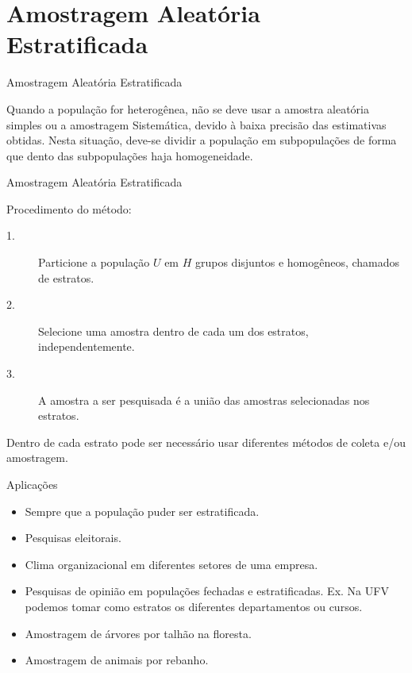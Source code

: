 \documentclass[14pt,aspectratio=1610]{beamer}
\begin{document}
\section{Amostragem Aleatória Estratificada}
\begin{frame}{Amostragem Aleatória Estratificada}
    \begin{block}{}
    \justifying
Quando a população for heterogênea, não se deve usar a amostra aleatória
simples ou a amostragem Sistemática, devido à baixa precisão das estimativas obtidas. Nesta situação, deve-se dividir a população em subpopulações de forma que dento das subpopulações haja homogeneidade.
    \end{block}
\end{frame}

\begin{frame}{Amostragem Aleatória Estratificada}
    \begin{block}{}
    \justifying
Procedimento do método:
\begin{description}
    \item[1.~]Particione a população $U$ em $H$ grupos disjuntos e homogêneos, chamados de estratos.\pause
    \item[2.~]Selecione uma amostra dentro de cada um dos estratos, independentemente.\pause
    \item[3.~]A amostra a ser pesquisada é a união das amostras selecionadas nos estratos.\pause
\end{description}
Dentro de cada estrato pode ser necessário usar diferentes métodos de
coleta e/ou amostragem.
    \end{block}
\end{frame}

\begin{frame}{Aplicações}
    \begin{block}{}
    \justifying
\begin{itemize}[label={}]
    \item Sempre que a população puder ser estratificada.\pause
    \item Pesquisas eleitorais.\pause
    \item Clima organizacional em diferentes setores de uma empresa.\pause
    \item Pesquisas de opinião em populações fechadas e estratificadas. Ex. Na UFV podemos tomar como estratos os diferentes departamentos ou cursos.\pause
    \item Amostragem de árvores por talhão na floresta.\pause
    \item Amostragem de animais por rebanho.
\end{itemize}
    \end{block}
\end{frame}
\end{document}
